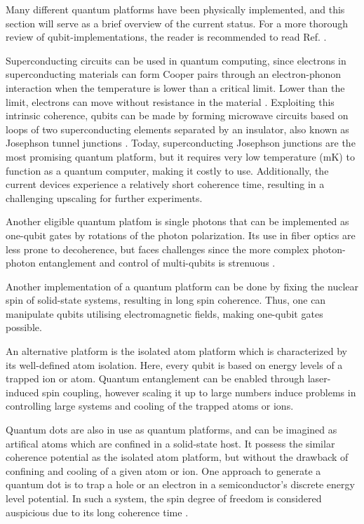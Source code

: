 
Many different quantum platforms have been physically implemented, and this section will serve as a brief overview of the current status. For a more thorough review of qubit-implementations, the reader is recommended to read Ref. \cite{Acin2018}.

Superconducting circuits can be used in quantum computing, since electrons in superconducting materials can form Cooper pairs through an electron-phonon interaction when the temperature is lower than a critical limit. Lower than the limit, electrons can move without resistance in the material \cite{KristianFossheim2004}. Exploiting this intrinsic coherence, qubits can be made by forming microwave circuits based on loops of two superconducting elements separated by an insulator, also known as Josephson tunnel junctions \cite{Acin2018}. Today, superconducting Josephson junctions are the most promising quantum platform, but it requires very low temperature (mK) to function as a quantum computer, making it costly to use. Additionally, the current devices experience a relatively short coherence time, resulting in a challenging upscaling for further experiments.

Another eligible quantum platfom is single photons that can be implemented as one-qubit gates by rotations of the photon polarization. Its use in fiber optics are less prone to decoherence, but faces challenges since the more complex photon-photon entanglement and control of multi-qubits is strenuous \cite{Ladd2010}.

Another implementation of a quantum platform can be done by fixing the nuclear spin of solid-state systems, resulting in long spin coherence. Thus, one can manipulate qubits utilising electromagnetic fields, making one-qubit gates possible.

An alternative platform is the isolated atom platform which is characterized by its well-defined atom isolation. Here, every qubit is based on energy levels of a trapped ion or atom. Quantum entanglement can be enabled through laser-induced spin coupling, however scaling it up to large numbers induce problems in controlling large systems and cooling of the trapped atoms or ions.

Quantum dots are also in use as quantum platforms, and can be imagined as artifical atoms which are confined in a solid-state host. It possess the similar coherence potential as the isolated atom platform, but without the drawback of confining and cooling of a given atom or ion. One approach to generate a quantum dot is to trap a hole or an electron in a semiconductor's discrete energy level potential. In such a system, the spin degree of freedom is considered auspicious due to its long coherence time \cite{Acin2018}.

